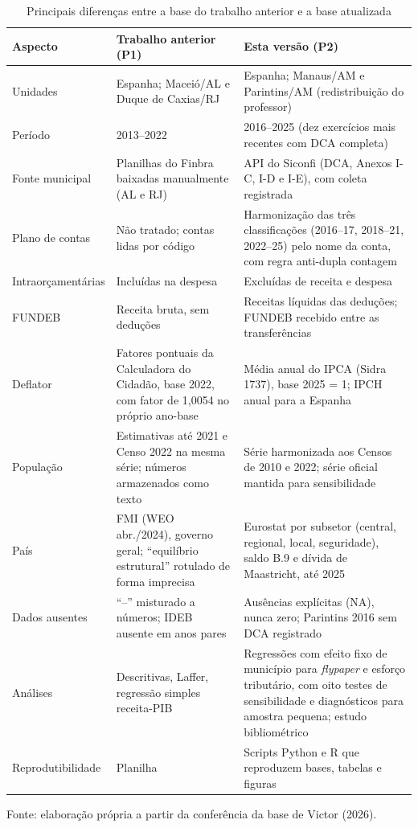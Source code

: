 \begin{table}[htbp]
\centering
\caption{Principais diferenças entre a base do trabalho anterior e a base atualizada}\label{tab:mudancas}
\scriptsize
\begin{tabular}{p{2.6cm}p{5.7cm}p{6.2cm}}
\toprule
Aspecto & Trabalho anterior (P1) & Esta versão (P2)\\
\midrule
Unidades & Espanha; Maceió/AL e Duque de Caxias/RJ & Espanha; Manaus/AM e Parintins/AM (redistribuição do professor)\\
Período & 2013--2022 & 2016--2025 (dez exercícios mais recentes com DCA completa)\\
Fonte municipal & Planilhas do Finbra baixadas manualmente (AL e RJ) & API do Siconfi (DCA, Anexos I-C, I-D e I-E), com coleta registrada\\
Plano de contas & Não tratado; contas lidas por código & Harmonização das três classificações (2016--17, 2018--21, 2022--25) pelo nome da conta, com regra anti-dupla contagem\\
Intraorçamentárias & Incluídas na despesa & Excluídas de receita e despesa\\
FUNDEB & Receita bruta, sem deduções & Receitas líquidas das deduções; FUNDEB recebido entre as transferências\\
Deflator & Fatores pontuais da Calculadora do Cidadão, base 2022, com fator de 1,0054 no próprio ano-base & Média anual do IPCA (Sidra 1737), base 2025 = 1; IPCH anual para a Espanha\\
População & Estimativas até 2021 e Censo 2022 na mesma série; números armazenados como texto & Série harmonizada aos Censos de 2010 e 2022; série oficial mantida para sensibilidade\\
País & FMI (WEO abr./2024), governo geral; ``equilíbrio estrutural'' rotulado de forma imprecisa & Eurostat por subsetor (central, regional, local, seguridade), saldo B.9 e dívida de Maastricht, até 2025\\
Dados ausentes & ``--'' misturado a números; IDEB ausente em anos pares & Ausências explícitas (NA), nunca zero; Parintins 2016 sem DCA registrado\\
Análises & Descritivas, Laffer, regressão simples receita-PIB & Regressões com efeito fixo de município para \textit{flypaper} e esforço tributário, com oito testes de sensibilidade e diagnósticos para amostra pequena; estudo bibliométrico\\
Reprodutibilidade & Planilha & Scripts Python e R que reproduzem bases, tabelas e figuras\\
\bottomrule
\end{tabular}
\par\smallskip
\begin{minipage}{0.97\textwidth}\scriptsize Fonte: elaboração própria a partir da conferência da base de Victor (2026).\end{minipage}
\end{table}


